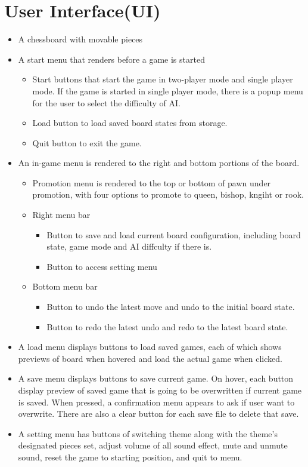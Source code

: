 \documentclass[a4paper, 10pt, titlepage]{report}
\begin{document}
\section{User Interface(UI)}
\begin{itemize}
  \item A chessboard with movable pieces

  \item A start menu that renders before a game is started
        \begin{itemize}
          \item Start buttons that start the game in two-player mode and single player mode. If the game is started in single player mode, there is a popup menu for the user to select the difficulty of AI.
          \item Load button to load saved board states from storage.
          \item Quit button to exit the game.
        \end{itemize}
  \item An in-game menu is rendered to the right and bottom portions of the board.
        \begin{itemize}
          \item Promotion menu is rendered to the top or bottom of pawn under promotion, with four options to promote to queen, bishop, kngiht or rook.
          \item Right menu bar

                \begin{itemize}
                  \item Button to save and load current board configuration, including board state, game mode and AI diffculty if there is.
                  \item Button to access setting menu
                \end{itemize}

          \item Bottom menu bar
                \begin{itemize}
                  \item Button to undo the latest move and undo to the initial board state.
                  \item Button to redo the latest undo and redo to the latest board state.
                \end{itemize}
        \end{itemize}
  \item A load menu displays buttons to load saved games, each of which shows previews of board when hovered and load the actual game when clicked.
  \item A save menu displays buttons to save current game. On hover, each button display preview of saved game that is going to be overwritten if current game is saved. When pressed, a confirmation menu appears to ask if user want to overwrite. There are also a clear button for each save file to delete that save.
  \item A setting menu has buttons of switching theme along with the theme's designated pieces set, adjust volume of all sound effect, mute and unmute sound, reset the game to starting position, and quit to menu.
\end{itemize}
\end{document}
